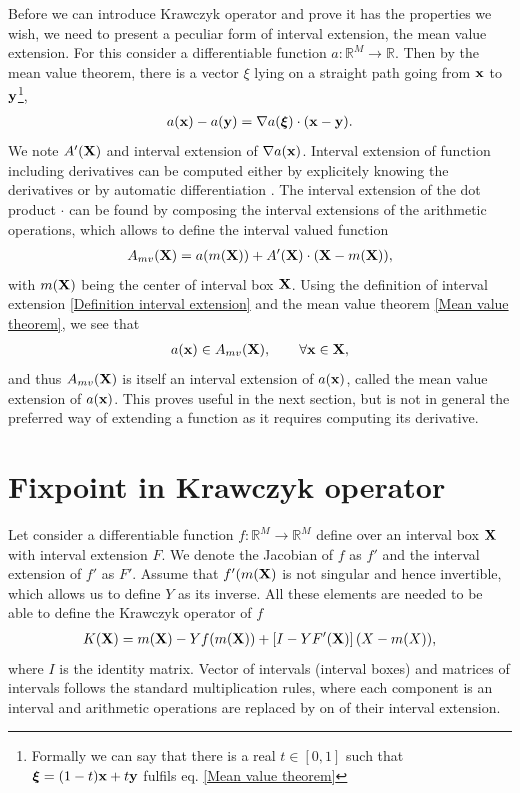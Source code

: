 \documentclass[
11pt, %
english, %
singlespacing, %
nolistspacing, %
liststotoc, %
headsepline, %
]{MastersDoctoralThesis} %
\begin{document}
Before we can introduce Krawczyk operator and prove it has the properties we wish, we need to present a peculiar form of interval extension, the mean value extension. For this consider a differentiable function $a : \mathbb{R}^M \rightarrow \mathbb{R}$. Then by the mean value theorem, there is a vector $\xi$ lying on a straight path going from $\boldsymbol{\mathrm{x}}$ to $\boldsymbol{\mathrm{y}}$\footnote{Formally we can say that there is a real $t \in [0, 1]$ such that $\boldsymbol{\mathrm{\xi}} = (1 - t)\boldsymbol{\mathrm{x}} + t \boldsymbol{\mathrm{y}}$ fulfils eq. \eqref{Mean value theorem}},
\begin{align}
	a(\boldsymbol{\mathrm{x}}) - a(\boldsymbol{\mathrm{y}}) = \nabla a(\boldsymbol{\mathrm{\xi}}) \cdot (\boldsymbol{\mathrm{x}} - \boldsymbol{\mathrm{y}}). \label{Mean value theorem}
\end{align}
We note $A'(\boldsymbol{\mathrm{X}})$ and interval extension of $\nabla a(\boldsymbol{\mathrm{x}})$. Interval extension of function including derivatives can be computed either by explicitely knowing the derivatives or by automatic differentiation \cite{fike2012automatic}. The interval extension of the dot product $\cdot$ can be found by composing the interval extensions of the arithmetic operations, which allows to define the interval valued function
\begin{align}
	A_{mv}(\boldsymbol{\mathrm{X}}) = a(m(\boldsymbol{\mathrm{X}})) + A'(\boldsymbol{\mathrm{X}}) \cdot (\boldsymbol{\mathrm{X}} - m(\boldsymbol{\mathrm{X}})), \label{Mean value extension}
\end{align}
with $m(\boldsymbol{\mathrm{X}})$ being the center of interval box $\boldsymbol{\mathrm{X}}$. Using the definition of interval extension \eqref{Definition interval extension} and the mean value theorem \eqref{Mean value theorem}, we see that
\begin{align}
	a(\boldsymbol{\mathrm{x}}) \in A_{mv}(\boldsymbol{\mathrm{X}}), \qquad \forall \boldsymbol{\mathrm{x}} \in \boldsymbol{\mathrm{X}},
\end{align}
and thus $A_{mv}(\boldsymbol{\mathrm{X}})$ is itself an interval extension of $a(\boldsymbol{\mathrm{x}})$, called the mean value extension of $a(\boldsymbol{\mathrm{x}})$. This proves useful in the next section, but is not in general the preferred way of extending a function as it requires computing its derivative.

\section{Fixpoint in Krawczyk operator}

Let consider a differentiable function $f : \mathbb{R}^M \rightarrow \mathbb{R}^M$ define over an interval box $\boldsymbol{\mathrm{X}}$ with interval extension $F$. We denote the Jacobian of $f$ as $f'$ and the interval extension of $f'$ as $F'$. Assume that $f'(m(\boldsymbol{\mathrm{X}})$ is not singular and hence invertible, which allows us to define $Y$ as its inverse. All these elements are needed to be able to define the Krawczyk operator of $f$
\begin{align}
	K(\boldsymbol{\mathrm{X}}) = m(\boldsymbol{\mathrm{X}}) - Y f(m(\boldsymbol{\mathrm{X}})) + \left[I - Y F'(\boldsymbol{\mathrm{X}})\right] (X - m(X)), \label{Krawczyk operator}
\end{align}
where $I$ is the identity matrix. Vector of intervals (interval boxes) and matrices of intervals follows the standard multiplication rules, where each component is an interval and arithmetic operations are replaced by on of their interval extension.
\end{document}
